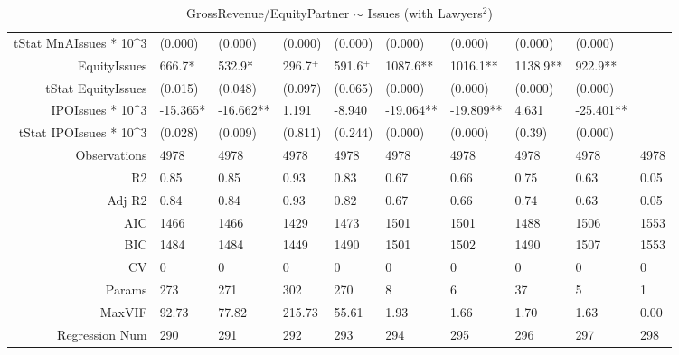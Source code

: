 \begin{table}[ht]
\begin{tabular}{rlllllllll}
  tStat MnAIssues * 10^3 & (0.000) & (0.000) & (0.000) & (0.000) & (0.000) & (0.000) & (0.000) & (0.000) &  \\ 
  EquityIssues & 666.7* & 532.9* & 296.7$^{+}$ & 591.6$^{+}$ & 1087.6** & 1016.1** & 1138.9** & 922.9** &  \\ 
  tStat EquityIssues & (0.015) & (0.048) & (0.097) & (0.065) & (0.000) & (0.000) & (0.000) & (0.000) &  \\ 
  IPOIssues * 10^3 & -15.365* & -16.662** & 1.191 & -8.940 & -19.064** & -19.809** & 4.631 & -25.401** &  \\ 
  tStat IPOIssues * 10^3 & (0.028) & (0.009) & (0.811) & (0.244) & (0.000) & (0.000) & (0.39) & (0.000) &  \\ 
  Observations & 4978 & 4978 & 4978 & 4978 & 4978 & 4978 & 4978 & 4978 & 4978 \\ 
  R2 & 0.85 & 0.85 & 0.93 & 0.83 & 0.67 & 0.66 & 0.75 & 0.63 & 0.05 \\ 
  Adj R2 & 0.84 & 0.84 & 0.93 & 0.82 & 0.67 & 0.66 & 0.74 & 0.63 & 0.05 \\ 
  AIC & 1466 & 1466 & 1429 & 1473 & 1501 & 1501 & 1488 & 1506 & 1553 \\ 
  BIC & 1484 & 1484 & 1449 & 1490 & 1501 & 1502 & 1490 & 1507 & 1553 \\ 
  CV & 0 & 0 & 0 & 0 & 0 & 0 & 0 & 0 & 0 \\ 
  Params & 273 & 271 & 302 & 270 & 8 & 6 & 37 & 5 & 1 \\ 
  MaxVIF & 92.73 & 77.82 & 215.73 & 55.61 & 1.93 & 1.66 & 1.70 & 1.63 & 0.00 \\ 
  Regression Num & 290 & 291 & 292 & 293 & 294 & 295 & 296 & 297 & 298 \\ 
   \hline
\end{tabular}
\caption{GrossRevenue/EquityPartner $\sim$ Issues (with Lawyers$^2$)} 
\end{table}
